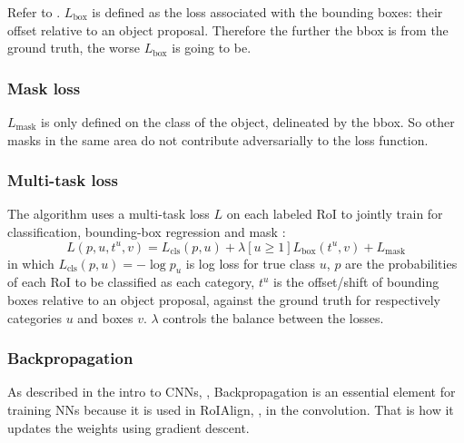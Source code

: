 Refer to . $L_\textrm{box}$ is defined as the loss associated with the bounding boxes: their offset relative to an object proposal.
Therefore the further the bbox is from the ground truth, the worse $L_\textrm{box}$ is going to be.


\subsubsection{Mask loss}\label{s:loss-mask}

$L_\textrm{mask}$ is only defined on the class of the object, delineated by the bbox. So other masks in the same area do not contribute adversarially to the loss function.

\subsubsection{Multi-task loss}\label{s:loss-multi}

The algorithm uses a multi-task loss $L$ on each labeled RoI to jointly train for classification, bounding-box regression \cite{Girshick_2015} and mask \cite{He_2017} :
\begin{equation}
\label{e:loss}
L(p, u, t^u, v) = L_\textrm{cls}(p, u) + \lambda [u \ge 1] L_\textrm{box}(t^u, v) + L_\textrm{mask}
\end{equation}
in which $L_\textrm{cls}(p, u) = -\log p_u$ is log loss for true class $u$, $p$ are the probabilities of each RoI to be classified as each category, $t^u$ is the offset/shift of bounding boxes relative to an object proposal, against the ground truth for respectively categories $u$ and boxes $v$.
$\lambda$ controls the balance between the losses.


\subsubsection{Backpropagation}\label{s:trainalg-backprop}

As described in the intro to CNNs, , Backpropagation is an essential element for training NNs because it is used in RoIAlign, , in the convolution. That is how it updates the weights using gradient descent.


